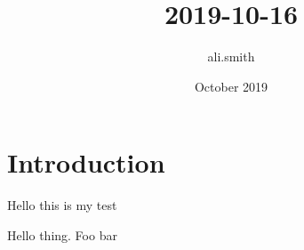 \documentclass{article}
\title{2019-10-16}
\author{ali.smith }
\date{October 2019}
\begin{document}
\maketitle

\section{Introduction}
Hello this is my test

Hello thing. Foo bar
\end{document}
